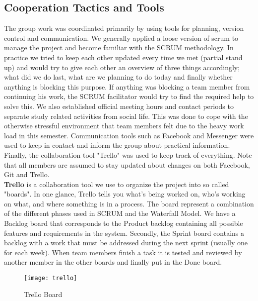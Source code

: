 \subsection{Cooperation Tactics and Tools}
The group work was coordinated primarily by using tools for planning, version control and communication. We generally applied a loose version of scrum to manage the project and become familiar with the SCRUM methodology. In practice we tried to keep each other updated every time we met (partial stand up) and would try to give each other an overview of three things accordingly; what did we do last, what are we planning to do today and finally whether anything is blocking this purpose. If anything was blocking a team member from continuing his work, the SCRUM facilitator would try to find the required help to solve this. 
We also established official meeting hours and contact periods to separate study related activities from social life. This was done to cope with the otherwise stressful environment that team members felt due to the heavy work load in this semester. Communication tools such as Facebook and Messenger were used to keep in contact and inform the group about practical information. Finally, the collaboration tool "Trello"  was used to keep track of everything. Note that all members are assumed to stay updated about changes on both Facebook, Git and Trello. 
\\
\textbf{Trello} is a collaboration tool we use to organize the project into so called "boards". In one glance, Trello tells you what's being worked on, who's working on what, and where something is in a process. The board represent a combination of the different phases used in SCRUM and the Waterfall Model. We have a Backlog board that corresponds to the Product backlog containing all possible features and requirements in the system. Secondly, the Sprint board contains a backlog with a work that must be addressed during the next sprint (usually one for each week). When team members finish a task it is tested and reviewed by another member in the other boards and finally put in the Done board. 

\begin{figure}[H]
	\texttt{[image: trello]}
	\caption{Trello Board}
	\label{fig:trello}
\end{figure}
